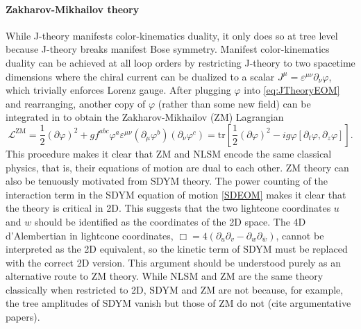 \documentclass[11pt,letter]{article}
\def\be{\begin{equation}}
\def\ee{\end{equation}}
\begin{document}
\paragraph{Zakharov-Mikhailov theory}
\label{sec:ZMTheory}
While J-theory manifests color-kinematics duality, it only does so at tree level because J-theory breaks manifest Bose symmetry.
Manifest color-kinematics duality can be achieved at all loop orders by restricting J-theory to two spacetime dimensions where the chiral current can be dualized to a scalar $J^\mu = \varepsilon^{\mu\nu} \partial_\nu \varphi$, which trivially enforces Lorenz gauge.
After plugging $\varphi$ into \cref{eq:JTheoryEOM} and rearranging, another copy of $\varphi$ (rather than some new field) can be integrated in to obtain the Zakharov-Mikhailov (ZM) Lagrangian
\be
\label{eq:ZMLagrangian}
\mathcal{L}^{\text{ZM}} = \frac{1}{2}(\partial \varphi)^2 + g f^{abc} \varphi^a \varepsilon^{\mu\nu}(\partial_\mu \varphi^b)( \partial_\nu \varphi^c) =  \text{tr}\left[\frac{1}{2}(\partial \varphi)^2-i g \varphi [\partial_t \varphi, \partial_z \varphi ]\right] .
\ee
This procedure makes it clear that ZM and NLSM encode the same classical physics, that is, their equations of motion are dual to each other.
ZM theory can also be tenuously motivated from SDYM theory.
The power counting of the interaction term in the SDYM equation of motion \cref{SDEOM} makes it clear that the theory is critical in 2D.
This suggests that the two lightcone coordinates $u$ and $w$ should be identified as the coordinates of the 2D space.
The 4D d'Alembertian in lightcone coordinates, $\Box = 4 (\partial_u \partial_v - \partial_w \partial_{\bar{w}})$, cannot be interpreted as the 2D equivalent, so the kinetic term of SDYM must be replaced with the correct 2D version.
This argument should be understood purely as an alternative route to ZM theory.
While NLSM and ZM are the same theory classically when restricted to 2D, SDYM and ZM are not because, for example, the tree amplitudes of SDYM vanish but those of ZM do not (cite argumentative papers).
\end{document}
